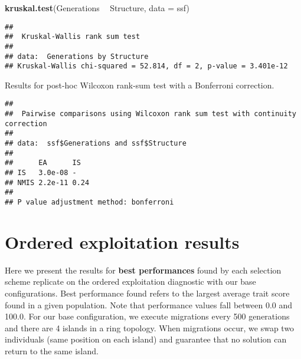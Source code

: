 \documentclass[]{book}
\newenvironment{Shaded}{\begin{snugshade}}{\end{snugshade}}
\newcommand{\DataTypeTok}[1]{\textcolor[rgb]{0.13,0.29,0.53}{#1}}
\newcommand{\KeywordTok}[1]{\textcolor[rgb]{0.13,0.29,0.53}{\textbf{#1}}}
\newcommand{\NormalTok}[1]{#1}
\newcommand{\OperatorTok}[1]{\textcolor[rgb]{0.81,0.36,0.00}{\textbf{#1}}}
\newcommand{\OtherTok}[1]{\textcolor[rgb]{0.56,0.35,0.01}{#1}}
\newcommand{\StringTok}[1]{\textcolor[rgb]{0.31,0.60,0.02}{#1}}
\begin{document}
\begin{Shaded}
\begin{Highlighting}[]
\KeywordTok{kruskal.test}\NormalTok{(Generations }\OperatorTok{~}\StringTok{ }\NormalTok{Structure, }\DataTypeTok{data =}\NormalTok{ ssf)}
\end{Highlighting}
\end{Shaded}

\begin{verbatim}
## 
##  Kruskal-Wallis rank sum test
## 
## data:  Generations by Structure
## Kruskal-Wallis chi-squared = 52.814, df = 2, p-value = 3.401e-12
\end{verbatim}

Results for post-hoc Wilcoxon rank-sum test with a Bonferroni correction.

\begin{Shaded}
\end{Shaded}

\begin{verbatim}
## 
##  Pairwise comparisons using Wilcoxon rank sum test with continuity correction 
## 
## data:  ssf$Generations and ssf$Structure 
## 
##      EA      IS  
## IS   3.0e-08 -   
## NMIS 2.2e-11 0.24
## 
## P value adjustment method: bonferroni
\end{verbatim}

\hypertarget{ordered-exploitation-results}{%
\chapter{Ordered exploitation results}\label{ordered-exploitation-results}}

Here we present the results for \textbf{best performances} found by each selection scheme replicate on the ordered exploitation diagnostic with our base configurations.
Best performance found refers to the largest average trait score found in a given population.
Note that performance values fall between 0.0 and 100.0.
For our base configuration, we execute migrations every 500 generations and there are 4 islands in a ring topology.
When migrations occur, we swap two individuals (same position on each island) and guarantee that no solution can return to the same island.
\end{document}

